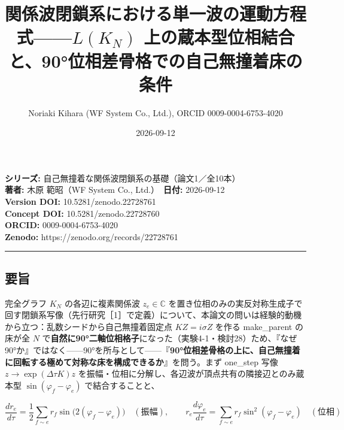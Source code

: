 \documentclass[
  a4paper,
]{ltjsarticle}
\title{関係波閉鎖系における単一波の運動方程式------\(L(K_N)\)
上の蔵本型位相結合と、90°位相差骨格での自己無撞着床の条件}
\author{Noriaki Kihara (WF System Co., Ltd.), ORCID 0009-0004-6753-4020}
\date{2026-09-12}
\begin{document}
\maketitle

\textbf{シリーズ:} 自己無撞着な関係波閉鎖系の基礎（論文1／全10本）\\
\textbf{著者:} 木原 範昭（WF System Co., Ltd.）　\textbf{日付:}
2026-09-12\\
\textbf{Version DOI:} 10.5281/zenodo.22728761\\
\textbf{Concept DOI:} 10.5281/zenodo.22728760\\
\textbf{ORCID:} 0009-0004-6753-4020\\
\textbf{Zenodo:} https://zenodo.org/records/22728761\\

\begin{center}\rule{0.5\linewidth}{0.5pt}\end{center}

\subsection{要旨}\label{ux8981ux65e8}

完全グラフ \(K_N\) の各辺に複素関係波 \(z_e\in\mathbb C\)
を置き位相のみの実反対称生成子で回す閉鎖系写像（先行研究［1］で定義）について、本論文の問いは経験的動機から立つ：乱数シードから自己無撞着固定点
\(KZ=i\sigma Z\) を作る make\_parent の床が全 \(N\)
で\textbf{自然に90°二軸位相格子}になった（実験4-1・検討28）ため、『なぜ90°か』ではなく------90°を所与として------『\textbf{90°位相差骨格の上に、自己無撞着に回転する極めて対称な床を構成できるか}』を問う。まず
one\_step 写像 \(z\to\exp(\Delta\tau K)z\)
を振幅・位相に分解し、各辺波が頂点共有の隣接辺とのみ蔵本型
\(\sin(\varphi_f-\varphi_e)\) で結合することと、

\[\frac{dr_e}{d\tau}=\frac12\sum_{f\sim e}r_f\sin\!\big(2(\varphi_f-\varphi_e)\big)\quad(\text{振幅}),\qquad r_e\frac{d\varphi_e}{d\tau}=\sum_{f\sim e}r_f\sin^2(\varphi_f-\varphi_e)\quad(\text{位相})\]
\end{document}
